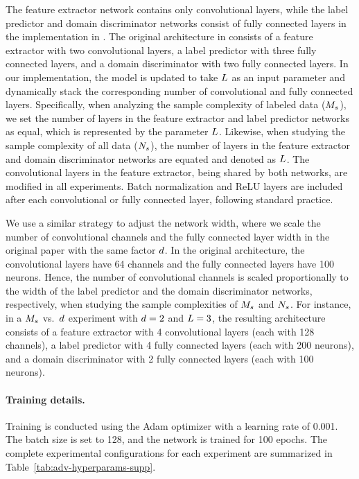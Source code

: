\documentclass[review,supplement,onefignum,onetabnum]{siamonline250211}
\begin{document}
The feature extractor network contains only convolutional layers, while the label predictor and domain discriminator networks consist of fully connected layers in the implementation in \cite{fungtion_DANN_py3}. The original architecture in \cite{GaninUAGLLML16} consists of a feature extractor with two convolutional layers, a label predictor with three fully connected layers, and a domain discriminator with two fully connected layers. In our implementation, the model is updated to take $L$ as an input parameter and dynamically stack the corresponding number of convolutional and fully connected layers. Specifically, when analyzing the sample complexity of labeled data ($M_s$), we set the number of layers in the feature extractor and label predictor networks as equal, which is represented by the parameter $L$. Likewise, when studying the sample complexity of all data ($N_s$), the number of layers in the feature extractor and domain discriminator networks are equated and denoted as  $L$. The convolutional layers in the feature extractor, being shared by both networks, are modified in all experiments. Batch normalization and ReLU layers are included after each convolutional or fully connected layer, following standard practice.

We use a similar strategy to adjust the network width, where we scale the number of convolutional channels and the fully connected layer width in the original paper  \cite{GaninUAGLLML16}  with the same factor ${d}$. In the original architecture, the convolutional layers have 64 channels and the fully connected layers have 100 neurons. Hence, the number of convolutional channels is scaled proportionally to the width of the label predictor and the domain discriminator networks, respectively, when studying the sample complexities of $M_s$ and $N_s$. For instance, in a $M_s$ vs.\ ${d}$ experiment with ${d}=2$ and $L=3$, the resulting architecture consists of a feature extractor with 4 convolutional layers (each with 128 channels), a label predictor with 4 fully connected layers (each with 200 neurons), and a domain discriminator with 2 fully connected layers (each with 100 neurons).

\paragraph{Training details.}
Training is conducted using the Adam optimizer with a learning rate of 0.001. The batch size is set to 128, and the network is trained for 100 epochs. The complete experimental configurations for each experiment are summarized in Table~\ref{tab:adv-hyperparams-supp}.
\end{document}
